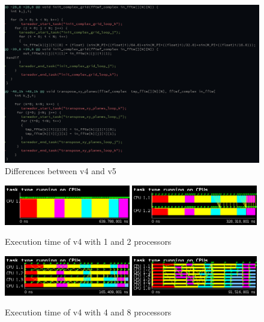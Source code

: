 \begin{figure}[H]%
    \label{fig:diff}
    \centering
    \includegraphics[width=\textwidth]{./data/3dfft_/plots/diff.png}
    \caption{Differences between v4 and v5}%
\end{figure}

\begin{figure}[H]%
    \label{fig:plot_v4_01}
    \centering
    \includegraphics[width=0.49\textwidth]{./data/3dfft_/plots/v4_01.png}
    \includegraphics[width=0.49\textwidth]{./data/3dfft_/plots/v4_02.png}
    \caption{Execution time of v4 with 1 and 2 processors}%
\end{figure}

\begin{figure}[H]%
    \label{fig:plot_v4_04}
    \centering
    \includegraphics[width=0.49\textwidth]{./data/3dfft_/plots/v4_04.png}
    \includegraphics[width=0.49\textwidth]{./data/3dfft_/plots/v4_08.png}
    \caption{Execution time of v4 with 4 and 8 processors}%
\end{figure}

